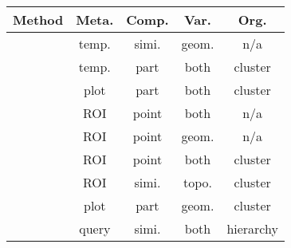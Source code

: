 \begin{table}[!t]
\centering
\begin{tabular}{l|c|c|c|c} \hline
                         Method                & Meta. & Comp. & Var.    & Org.
 \\ \hline\hline
             \cite{Ovsjanikov:2011:ECV} & temp. & simi. & geom.  & n/a
 \\ \hline   \cite{Kim:2013:lpt}         & temp. & part & both    & cluster
 \\ \hline   \cite{Averkiou:2014:spm}  	   & plot & part & both   & cluster
 \\ \hline   \cite{Kim:2012:FC}         & ROI & point & both      & n/a
 \\ \hline   \cite{Rustamov:2013:SD}  & ROI   & point & geom.     & n/a
 \\ \hline   \cite{Huang:2014:FMN}       & ROI & point & both      & cluster
 \\ \hline   \cite{Xu:2014:OHSC}         & ROI & simi. & topo.     & cluster
 \\ \hline   \cite{Fish:2014:MR}         & plot & part  & geom.     & cluster
 \\ \hline   \cite{Huang:2013:QOC}       & query & simi. & both   & hierarchy
 \\ \hline
\end{tabular}
\caption{}
\label{tab:exploration}
\end{table}


